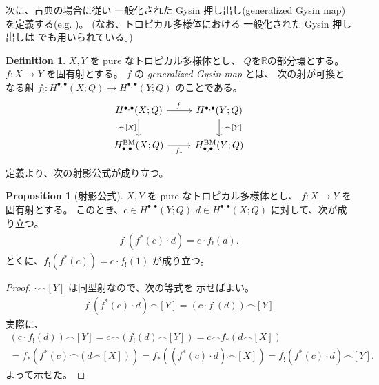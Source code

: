\documentclass[a4paper,dvipdfmx,reqno,12pt]{amsart}
\theoremstyle{definition}
\newtheorem{definition}[theorem]{Definition}
\newtheorem{proposition}[theorem]{Proposition}
\numberwithin{equation}{section}
\begin{document}
次に、古典の場合に従い
一般化された Gysin 押し出し(generalized Gysin map)
を定義する(e.g. 
\cite[Chapter 13. Appendix]{MR2810322})。
(なお、トロピカル多様体における
一般化された Gysin 押し出しは
\cite[Proposition 8.3]{} でも用いられている。)
\begin{definition}
$X,Y$ を pure なトロピカル多様体とし、
$Q$を$\mathbb{R}$の部分環とする。
$f\colon X\to Y$ を固有射とする。
$f$ の \emph{generalized Gysin map} とは、
次の射が可換となる射
$f_!\colon H^{\bullet,\bullet}(X;Q)\to 
H^{\bullet,\bullet}(Y;Q)$
のことである。
\begin{equation}
\begin{tikzcd}
	{H^{\bullet,\bullet}(X;Q)} & {H^{\bullet,\bullet}(Y;Q)} \\
	{H_{\bullet,\bullet}^{\mathrm{BM}}(X;Q)} & {H_{\bullet,\bullet}^{\mathrm{BM}}(Y;Q)}
	\arrow["{\cdot \frown [X]}"', from=1-1, to=2-1]
	\arrow["{\cdot\frown[Y]}", from=1-2, to=2-2]
	\arrow["{f_*}"', from=2-1, to=2-2]
	\arrow["{f_!}", from=1-1, to=1-2]
\end{tikzcd}    
\end{equation}

\end{definition}
定義より、次の射影公式が成り立つ。
\begin{proposition}[{射影公式}]
$X,Y$ を pure なトロピカル多様体とし、
$f\colon X\to Y$ を固有射とする。
このとき、$c\in H^{\bullet,\bullet}(Y;Q) $
$d\in H^{\bullet,\bullet}(X;Q)$
に対して、次が成り立つ。
\begin{align}
    f_!(f^{*}(c)\cdot d)=c\cdot f_!(d).
\end{align}
とくに、$f_!(f^{*}(c))=c\cdot f_!(1)$ が成り立つ。
\end{proposition}

\begin{proof}
$\cdot \frown [Y]$ は同型射なので、次の等式を
示せばよい。
\begin{align}
    f_!(f^{*}(c)\cdot d)\frown [Y]=(c\cdot f_!(d))\frown [Y]
\end{align}
実際に、
\begin{align}
(c\cdot f_!(d))\frown [Y]=
c\frown(f_!(d)\frown [Y])=
c\frown f_*(d\frown [X])\\
=f_*(f^*(c)\frown (d\frown [X]))=
f_*((f^*(c)\cdot d) \frown [X])
=f_!(f^{*}(c)\cdot d)\frown [Y].
\end{align}
よって示せた。
\end{proof}
\end{document}
